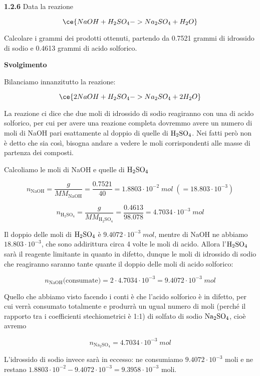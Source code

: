 \vspace{0.2cm}\textbf{1.2.6} Data la reazione

$$\ce{NaOH + H_2SO_4 -> Na_2SO_4 + H_2O}$$

Calcolare i grammi dei prodotti ottenuti, partendo da 0.7521 grammi di idrossido di sodio e 0.4613 grammi di acido solforico.

\vspace{0.2cm}\large\textbf{Svolgimento}\normalsize

\vspace{0.2cm}Bilanciamo innanzitutto la reazione:

$$\ce{2NaOH + H_2SO_4 -> Na_2SO_4 + 2H_2O}$$

La reazione ci dice che due moli di idrossido di sodio reagiranno con una di acido solforico, per cui per avere una reazione completa dovremmo avere un numero di moli di NaOH pari esattamente al doppio di quelle di $\rm H_2SO_4$. Nei fatti però non è detto che sia così, bisogna andare a vedere le moli corrispondenti alle masse di partenza dei composti.

Calcoliamo le moli di NaOH e quelle di $\rm H_2SO_4$

$$n_{\text{NaOH}}=\frac{g}{MM_{\text{NaOH}}}=\frac{0.7521}{40}=1.8803 \cdot 10^{-2}\;mol\;(=18.803 \cdot 10^{-3})$$

$$n_{\text{H}_2\text{SO}_4}=\frac{g}{MM_{\text{H}_2\text{SO}_4}}=\frac{0.4613}{98.078}=4.7034 \cdot 10^{-3}\;mol$$

Il doppio delle moli di $\rm H_2SO_4$ è $9.4072 \cdot 10^{-3}\;mol$, mentre di NaOH ne abbiamo $18.803 \cdot 10^{-3}$, che sono addirittura circa 4 volte le moli di acido. Allora l'$\rm H_2SO_4$ sarà il reagente limitante in quanto in difetto, dunque le moli di idrossido di sodio che reagiranno saranno tante quante il doppio delle moli di acido solforico:

$$n_{\text{NaOH}}\text{(consumate)}
=2 \cdot 4.7034 \cdot 10^{-3}
=9.4072 \cdot 10^{-3}\;mol$$

Quello che abbiamo visto facendo i conti è che l'acido solforico è in difetto, per cui verrà consumato totalmente e produrrà un ugual numero di moli (perché il rapporto tra i coefficienti stechiometrici è 1:1) di solfato di sodio $\rm Na_2SO_4$, cioè avremo

$$n_{\text{Na}_2\text{SO}_4}=4.7034 \cdot 10^{-3}\;mol$$

L'idrossido di sodio invece sarà in eccesso: ne consumiamo $9.4072 \cdot 10^{-3}$ moli e ne restano $1.8803 \cdot 10^{-2} - 9.4072 \cdot 10^{-3}=9.3958 \cdot 10^{-3}$ moli.

